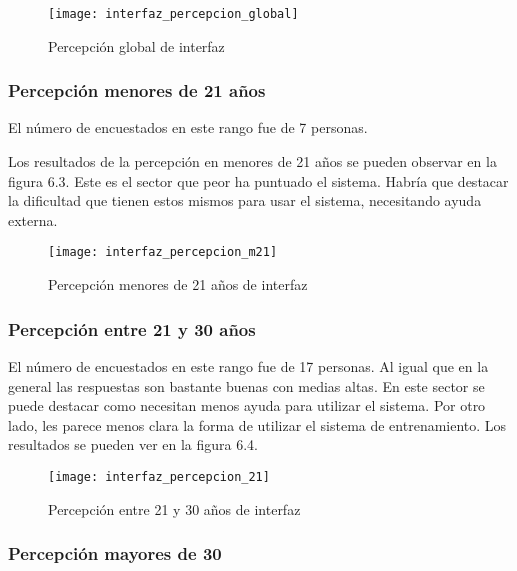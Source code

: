 \begin{figure}[htb]
  \centering
  \texttt{[image: interfaz\_percepcion\_global]}
  \caption[Percepción global de interfaz]{Percepción global de interfaz}
  \label{fig:Percepción global de interfaz}
\end{figure}

\subsubsection{Percepción menores de 21 años}

El número de encuestados en este rango fue de 7 personas.

Los resultados de la percepción en menores de 21 años se pueden observar en la figura 6.3.
Este es el sector que peor ha puntuado el sistema. Habría que destacar la dificultad
que tienen estos mismos para usar el sistema, necesitando ayuda externa.

\begin{figure}[htb]
  \centering
  \texttt{[image: interfaz\_percepcion\_m21]}
  \caption[Percepción menores de 21 años de interfaz]{Percepción menores de 21 años de interfaz}
  \label{fig:Percepción menores de 21 años de interfaz}
\end{figure}

\subsubsection{Percepción entre 21 y 30 años}

El número de encuestados en este rango fue de 17 personas. Al igual que en la general las respuestas
son bastante buenas con medias altas. En este sector se puede destacar como necesitan menos ayuda
para utilizar el sistema. Por otro lado, les parece menos clara la forma de utilizar el sistema
de entrenamiento. Los resultados se pueden ver en la figura 6.4.

\begin{figure}[htb]
  \centering
  \texttt{[image: interfaz\_percepcion\_21]}
  \caption[Percepción entre 21 y 30 años de interfaz]{Percepción entre 21 y 30 años de interfaz}
  \label{fig:Percepción entre 21 y 30 años de interfaz}
\end{figure}

\subsubsection{Percepción mayores de 30}

